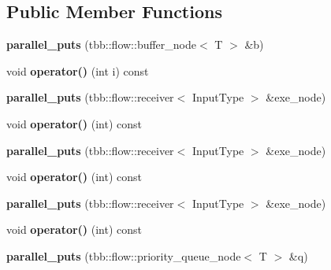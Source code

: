 \subsection*{Public Member Functions}
\begin{DoxyCompactItemize}
\item 
\hypertarget{structparallel__puts_a8ef29ce4347576994cb6f1b12a8c0a1a}{}{\bfseries parallel\+\_\+puts} (tbb\+::flow\+::buffer\+\_\+node$<$ T $>$ \&b)\label{structparallel__puts_a8ef29ce4347576994cb6f1b12a8c0a1a}

\item 
\hypertarget{structparallel__puts_a90a7bdea12055b7d5444d8516edddfa7}{}void {\bfseries operator()} (int i) const \label{structparallel__puts_a90a7bdea12055b7d5444d8516edddfa7}

\item 
\hypertarget{structparallel__puts_a9b546cbd2144ec7a267233a73b3077a8}{}{\bfseries parallel\+\_\+puts} (tbb\+::flow\+::receiver$<$ Input\+Type $>$ \&exe\+\_\+node)\label{structparallel__puts_a9b546cbd2144ec7a267233a73b3077a8}

\item 
\hypertarget{structparallel__puts_afb7691d9d3a911129a91337d3ace8310}{}void {\bfseries operator()} (int) const \label{structparallel__puts_afb7691d9d3a911129a91337d3ace8310}

\item 
\hypertarget{structparallel__puts_a9b546cbd2144ec7a267233a73b3077a8}{}{\bfseries parallel\+\_\+puts} (tbb\+::flow\+::receiver$<$ Input\+Type $>$ \&exe\+\_\+node)\label{structparallel__puts_a9b546cbd2144ec7a267233a73b3077a8}

\item 
\hypertarget{structparallel__puts_afb7691d9d3a911129a91337d3ace8310}{}void {\bfseries operator()} (int) const \label{structparallel__puts_afb7691d9d3a911129a91337d3ace8310}

\item 
\hypertarget{structparallel__puts_a9b546cbd2144ec7a267233a73b3077a8}{}{\bfseries parallel\+\_\+puts} (tbb\+::flow\+::receiver$<$ Input\+Type $>$ \&exe\+\_\+node)\label{structparallel__puts_a9b546cbd2144ec7a267233a73b3077a8}

\item 
\hypertarget{structparallel__puts_afb7691d9d3a911129a91337d3ace8310}{}void {\bfseries operator()} (int) const \label{structparallel__puts_afb7691d9d3a911129a91337d3ace8310}

\item 
\hypertarget{structparallel__puts_aafe4c8895ce74265e1de311806d4f7ee}{}{\bfseries parallel\+\_\+puts} (tbb\+::flow\+::priority\+\_\+queue\+\_\+node$<$ T $>$ \&q)\label{structparallel__puts_aafe4c8895ce74265e1de311806d4f7ee}


\end{DoxyCompactItemize}
